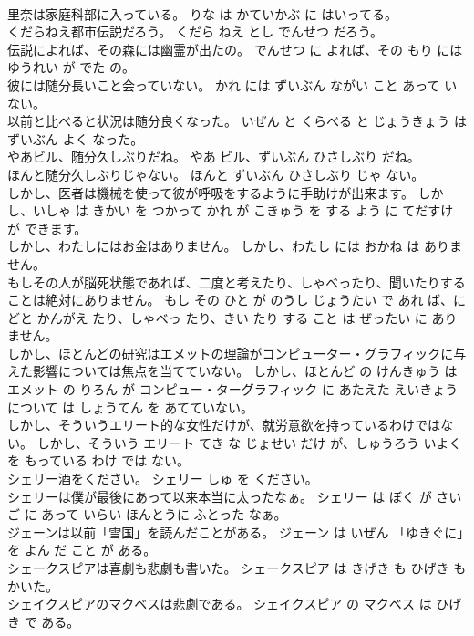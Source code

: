 \documentclass[8pt]{extreport}
\begin{document}
\begin{CJK}{UTF8}{min}
\\	里奈は家庭科部に入っている。	りな は かていかぶ に はいってる。	
\\	くだらねえ都市伝説だろう。	くだら ねえ とし でんせつ だろう。	
\\	伝説によれば、その森には幽霊が出たの。	でんせつ に よれば、その もり には ゆうれい が でた の。	
\\	彼には随分長いこと会っていない。	かれ には ずいぶん ながい こと あって いない。	
\\	以前と比べると状況は随分良くなった。	いぜん と くらべる と じょうきょう は ずいぶん よく なった。	
\\	やあビル、随分久しぶりだね。	やあ ビル、ずいぶん ひさしぶり だね。	
\\	ほんと随分久しぶりじゃない。	ほんと ずいぶん ひさしぶり じゃ ない。	
\\	しかし、医者は機械を使って彼が呼吸をするように手助けが出来ます。	しかし、いしゃ は きかい を つかって かれ が こきゅう を する よう に てだすけ が できます。	
\\	しかし、わたしにはお金はありません。	しかし、わたし には おかね は ありません。	
\\	もしその人が脳死状態であれば、二度と考えたり、しゃべったり、聞いたりすることは絶対にありません。	もし その ひと が のうし じょうたい で あれ ば、にどと かんがえ たり、しゃべっ たり、きい たり する こと は ぜったい に ありません。	
\\	しかし、ほとんどの研究はエメットの理論がコンピューター・グラフィックに与えた影響については焦点を当てていない。	しかし、ほとんど の けんきゅう は エメット の りろん が コンピュー・ターグラフィック に あたえた えいきょう について は しょうてん を あてていない。	
\\	しかし、そういうエリート的な女性だけが、就労意欲を持っているわけではない。	しかし、そういう エリート てき な じょせい だけ が、しゅうろう いよく を もっている わけ では ない。	
\\	シェリー酒をください。	シェリー しゅ を ください。	
\\	シェリーは僕が最後にあって以来本当に太ったなぁ。	シェリー は ぼく が さいご に あって いらい ほんとうに ふとった なぁ。	
\\	ジェーンは以前「雪国」を読んだことがある。	ジェーン は いぜん 「ゆきぐに」を よん だ こと が ある。	
\\	シェークスピアは喜劇も悲劇も書いた。	シェークスピア は きげき も ひげき も かいた。	
\\	シェイクスピアのマクベスは悲劇である。	シェイクスピア の マクベス は ひげき で ある。	

\end{CJK}
\end{document}
